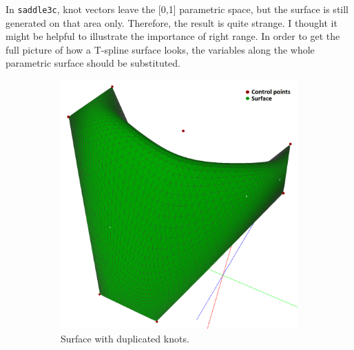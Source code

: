 \documentclass{article}
\begin{document}
In \texttt{saddle3c}, knot vectors leave the [0,1] parametric space, but the surface is still generated on that area only. Therefore, the result is quite strange. I thought it might be helpful to illustrate the importance of right range. In order to get the full picture of how a T-spline surface looks, the variables along the whole parametric surface should be substituted.

\begin{figure}[H]
\centering
\begin{subfigure}[b]{0.32\textwidth}
\includegraphics[width=\textwidth]{saddle3a}
\caption{Surface with duplicated knots.}
\label{saddle3a}
\end{subfigure}
\begin{subfigure}[b]{0.32\textwidth}

\end{subfigure}
\end{figure}
\end{document}
